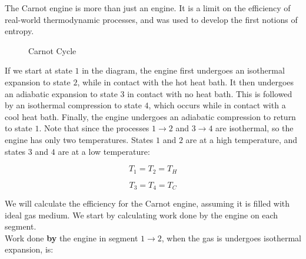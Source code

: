 \documentclass[12pt, a4paper]{article}
\begin{document}
The Carnot engine is more than just an engine. It is a limit on the efficiency of real-world thermodynamic processes, and was used to develop the first notions of entropy.

\begin{figure}[H]
\centering
{}
\caption{Carnot Cycle}
\end{figure}

If we start at state $1$ in the diagram, the engine first undergoes an isothermal expansion to state $2$, while in contact with the hot heat bath. It then undergoes an adiabatic expansion to state $3$ in contact with no heat bath. This is followed by an isothermal compression to state $4$, which occurs while in contact with a cool heat bath. Finally, the engine undergoes an adiabatic compression to return to state $1$. Note that since the processes $1 \rightarrow 2$ and $3 \rightarrow 4$ are isothermal, so the engine has only two temperatures. States $1$ and $2$ are at a high temperature, and states $3$ and $4$ are at a low temperature:

\[T_1=T_2=T_H\]

\[T_3=T_4=T_C\]

We will calculate the efficiency for the Carnot engine, assuming it is filled with ideal gas medium. We start by calculating work done by the engine on each segment. \\

Work done \textbf{by} the engine in segment $1\to2$, when the gas is undergoes isothermal expansion, is:
\end{document}
